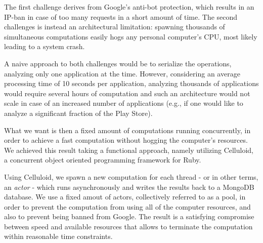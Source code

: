 The first challenge derives from Google's anti-bot protection, which results in an IP-ban in case of too many requests in a short amount of time.
The second challenges is instead an architectural limitation: spawning thousands of simultaneous computations easily hogs any personal computer's CPU, most likely leading to a system crash.

A naive approach to both challenges would be to serialize the operations, analyzing only one application at the time. However, considering an average processing time of 10 seconds per application, analyzing thousands of applications would require several hours of computation and such an architecture would not scale in case of an increased number of applications (e.g., if one would like to analyze a significant fraction of the Play Store).

What we want is then a fixed amount of computations running concurrently, in order to achieve a fast computation without hogging the computer's resources. We achieved this result taking a functional approach, namely utilizing Celluloid, a concurrent object oriented programming framework for Ruby.

Using Celluloid, we spawn a new computation for each thread - or in other terms, an \emph{actor} - which runs asynchronously and writes the results back to a MongoDB database. We use a fixed amout of actors, collectively referred to as a pool, in order to prevent the computation from using all of the computer resources, and also to prevent being banned from Google.
The result is a satisfying compromise between speed and available resources that allows to terminate the computation within reasonable time constraints.